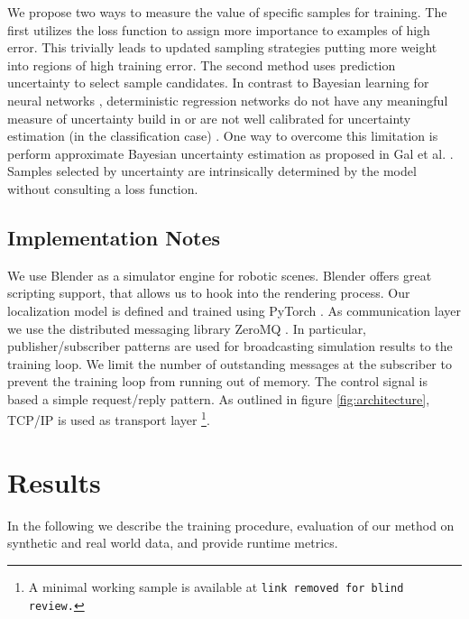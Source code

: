 \documentclass[conference]{IEEEtran}
\begin{document}
    We propose two ways to measure the value of specific samples for training. The first utilizes the loss function to assign more importance to examples of high error. This trivially leads to updated sampling strategies putting more weight into regions of high training error. The second method uses prediction uncertainty to select sample candidates. In contrast to Bayesian learning for neural networks \cite{neal2012bayesian}, deterministic regression networks do not have any meaningful measure of uncertainty build in or are not well calibrated for uncertainty estimation (in the classification case) \cite{guo2017calibration}. One way to overcome this limitation is perform approximate Bayesian uncertainty estimation as proposed in Gal et al. \cite{gal2015dropout}. Samples selected by uncertainty are intrinsically determined by the model without consulting a loss function.
    

\subsection{Implementation Notes}
    We use Blender \cite{blender} as a simulator engine for robotic scenes. Blender offers great scripting support, that allows us to hook into the rendering process. Our localization model is defined and trained using PyTorch \cite{paszke2017automatic}. As communication layer we use the distributed messaging library ZeroMQ \cite{zeromq_guide}. In particular, publisher/subscriber patterns are used for broadcasting simulation results to the training loop. We limit the number of outstanding messages at the subscriber to prevent the training loop from running out of memory. The control signal is based a simple request/reply pattern. As outlined in figure \ref{fig:architecture}, TCP/IP is used as transport layer \footnote{A minimal working sample is available at \texttt{link removed for blind review.}}.

\section{Results}

    In the following we describe the training procedure, evaluation of our method on synthetic and real world data, and provide runtime metrics.
\end{document}
